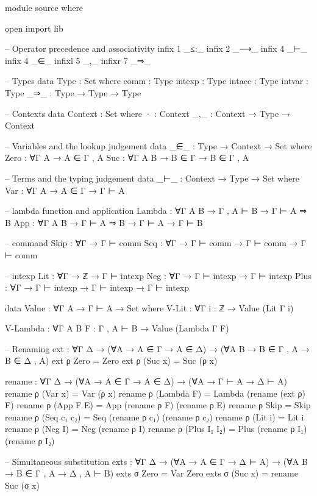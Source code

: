 \documentclass{article}
\begin{document}
\begin{prev}
\begin{code}
module source where

open import lib

-- Operator precedence and associativity
infix 1 _≤:_
infix 2 _⟶_ 
infix 4 _⊢_
infix 4 _∈_
infixl 5 _,_
infixr 7 _⇒_

-- Types
data Type : Set where
    comm : Type
    intexp : Type
    intacc : Type
    intvar : Type
    _⇒_ : Type  →  Type  →  Type

-- Contexts
data Context : Set where
    · : Context
    _,_ : Context  →  Type  →  Context

-- Variables and the lookup judgement
data _∈_ : Type  →  Context  →  Set where
    Zero : ∀{Γ A}  →  A ∈ Γ , A
    Suc : ∀{Γ A B}  →  B ∈ Γ  →  B ∈ Γ , A

-- Terms and the typing judgement
data _⊢_ : Context  →  Type  →  Set where
    Var : ∀{Γ A}  →  A ∈ Γ  →  Γ ⊢ A

    -- lambda function and application
    Lambda : ∀{Γ A B}  →  Γ , A ⊢ B  →  Γ ⊢ A ⇒ B
    App : ∀{Γ A B}  →  Γ ⊢ A ⇒ B  →  Γ ⊢ A  →  Γ ⊢ B

    -- command
    Skip : ∀{Γ} → Γ ⊢ comm
    Seq : ∀{Γ} → Γ ⊢ comm → Γ ⊢ comm → Γ ⊢ comm

    -- intexp
    Lit : ∀{Γ} → ℤ → Γ ⊢ intexp
    Neg : ∀{Γ} → Γ ⊢ intexp → Γ ⊢ intexp
    Plus : ∀{Γ} → Γ ⊢ intexp → Γ ⊢ intexp → Γ ⊢ intexp


data Value : ∀{Γ A}  →  Γ ⊢ A  →  Set where
    V-Lit : ∀{Γ} {i : ℤ} → Value (Lit {Γ} i)

    V-Lambda : ∀{Γ A B} {F : Γ , A ⊢ B}  →  Value (Lambda {Γ} F)

-- Renaming
ext : ∀{Γ Δ}  →  (∀{A}  →  A ∈ Γ  →  A ∈ Δ)  →  (∀{A B}  →  B ∈ Γ , A  →  B ∈ Δ , A)
ext ρ Zero = Zero
ext ρ (Suc x) = Suc (ρ x)

rename : ∀{Γ Δ}  →  (∀{A}  →  A ∈ Γ  →  A ∈ Δ)  →  (∀{A}  →  Γ ⊢ A  →  Δ ⊢ A)
rename ρ (Var x) = Var (ρ x)
rename ρ (Lambda F) = Lambda (rename (ext ρ) F)
rename ρ (App F E) = App (rename ρ F) (rename ρ E)
rename ρ Skip = Skip
rename ρ (Seq c₁ c₂) = Seq (rename ρ c₁) (rename ρ c₂)
rename ρ (Lit i) = Lit i
rename ρ (Neg I) = Neg (rename ρ I)
rename ρ (Plus I₁ I₂) = Plus (rename ρ I₁) (rename ρ I₂)

-- Simultaneous substitution
exts : ∀{Γ Δ}  →  (∀{A}  →  A ∈ Γ  →  Δ ⊢ A)  →  (∀{A B}  →  B ∈ Γ , A  →  Δ , A ⊢ B)
exts σ Zero = Var Zero
exts σ (Suc x) = rename Suc (σ x)


\end{code}
\end{prev}
\end{document}
